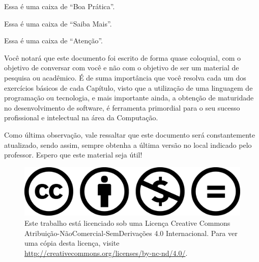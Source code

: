 \begin{boaPratica}
    Essa é uma caixa de ``Boa Prática''.
\end{boaPratica}

\begin{saibaMais}
    Essa é uma caixa de ``Saiba Mais''.
\end{saibaMais}

\begin{atencao}
    Essa é uma caixa de ``Atenção''.
\end{atencao}

Você notará que este documento foi escrito de forma quase coloquial, com o objetivo de conversar com você e não com o objetivo de ser um material de pesquisa ou acadêmico. É de suma importância que você resolva cada um dos exercícios básicos de cada Capítulo, visto que a utilização de uma linguagem de programação ou tecnologia, e mais importante ainda, a obtenção de maturidade no desenvolvimento de software, é ferramenta primordial para o seu sucesso profissional e intelectual na área da Computação.

Como última observação, vale ressaltar que este documento será constantemente atualizado, sendo assim, sempre obtenha a última versão no local indicado pelo professor. Espero que este material seja útil!

\vspace*{\fill}

\FloatBarrier
\begin{figure}[!htbp]
    \centering
    \includegraphics[scale=0.1]{imagens/logoCC}
    \\
    Este trabalho está licenciado sob uma Licença Creative Commons Atribuição-NãoComercial-SemDerivações 4.0 Internacional. Para ver uma cópia desta licença, visite \textcolor{blue}{\url{http://creativecommons.org/licenses/by-nc-nd/4.0/}}.
\end{figure}
\FloatBarrier
